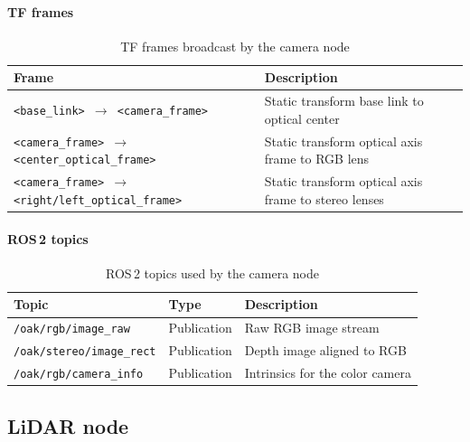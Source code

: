 \paragraph*{TF frames}
\begin{table}[H]
  \centering
  \begin{tabularx}{\textwidth}{ll}
    \toprule
    \textbf{Frame} & \textbf{Description}                                 \\
    \midrule
    \texttt{<base\_link> $\rightarrow$ <camera\_frame>}
                   & Static transform base link to optical center         \\
    \texttt{<camera\_frame> $\rightarrow$ <center\_optical\_frame>}
                   & Static transform optical axis frame to RGB lens      \\
    \texttt{<camera\_frame> $\rightarrow$ <right/left\_optical\_frame>}
                   & Static transform optical axis frame to stereo lenses \\
    \bottomrule
  \end{tabularx}
  \caption{TF frames broadcast by the camera node}
  \label{tab:camera-tf-frames}
\end{table}

\paragraph*{ROS\,2 topics}
\begin{table}[H]
  \centering
  \begin{tabular}{lll}
    \toprule
    \textbf{Topic}                   & \textbf{Type} & \textbf{Description}            \\
    \midrule
    \texttt{/oak/rgb/image\_raw}     & Publication   & Raw RGB image stream            \\
    \texttt{/oak/stereo/image\_rect} & Publication   & Depth image aligned to RGB      \\
    \texttt{/oak/rgb/camera\_info}   & Publication   & Intrinsics for the color camera \\
    \bottomrule
  \end{tabular}
  \caption{ROS\,2 topics used by the camera node}
  \label{tab:camera-topics}
\end{table}

\subsection{LiDAR node}


